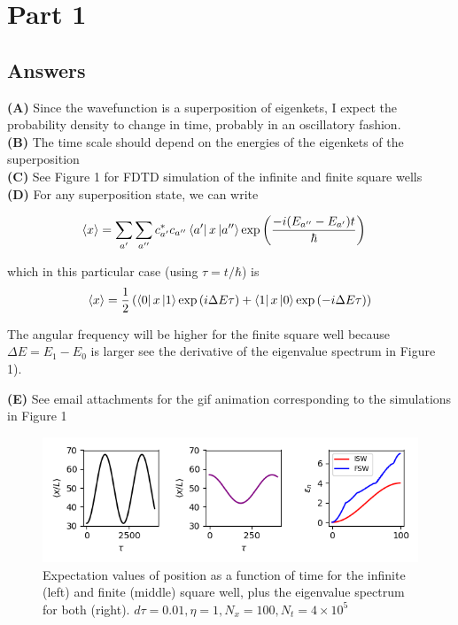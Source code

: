 \documentclass[12pt]{article}
\theoremstyle{definition}
\begin{document}
{\section{Part 1}

\subsection{Answers}

\noindent \textbf{(A)} Since the wavefunction is a superposition of eigenkets, I expect the probability density to change in time, probably in an oscillatory fashion.\\
\noindent \textbf{(B)} The time scale should depend on the energies of the eigenkets of the superposition\\
\noindent \textbf{(C)} See Figure 1 for FDTD simulation of the infinite and finite square wells\\
\noindent \textbf{(D)} For any superposition state, we can write

\begin{align*}
\langle x \rangle &= \sum_{a'}\sum_{a''}c_{a'}^{*}c_{a''}\bra{a'}x\ket{a''}\exp\left(\frac{-i(E_{a''}-E_{a'})t}{\hbar}\right)
\end{align*}

which in this particular case (using $\tau = t/\hbar$) is
\begin{align*}
\langle x \rangle = \frac{1}{2}\left(\bra{0}x\ket{1}\exp\left(i\Delta E\tau\right) + \bra{1}x\ket{0}\exp\left(-i\Delta E\tau\right)\right)\\
\end{align*}


The angular frequency will be higher for the finite square well because $\Delta E = E_{1}-E_{0}$ is larger see the derivative of the eigenvalue spectrum in Figure 1).


\noindent \textbf{(E)} See email attachments for the gif animation corresponding to the simulations in Figure 1


\begin{figure}
\includegraphics[scale=1]{Figure_1.png}
\centering
\caption{Expectation values of position as a function of time for the infinite (left) and finite (middle) square well, plus the eigenvalue spectrum for both (right). $d\tau = 0.01, \eta =1, N_{x}=100, N_{t} = 4\times 10^{5}$}
\end{figure}


}
\end{document}
